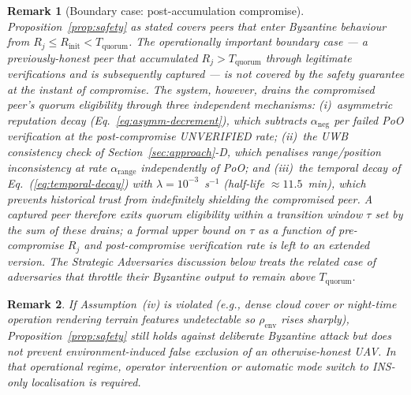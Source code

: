 \documentclass[journal,10pt,twocolumn]{IEEEtran}
\newtheorem{remark}{Remark}
\begin{document}
\begin{remark}[Boundary case: post-accumulation compromise]
\label{rem:post-accumulation}
Proposition~\ref{prop:safety} as stated covers peers that enter Byzantine behaviour from $R_j \leq R_\text{init} < T_\text{quorum}$. The operationally important boundary case --- a previously-honest peer that accumulated $R_j > T_\text{quorum}$ through legitimate verifications and is subsequently captured --- is not covered by the safety guarantee at the instant of compromise. The system, however, drains the compromised peer's quorum eligibility through three independent mechanisms: (i)~asymmetric reputation decay (Eq.~\ref{eq:asymm-decrement}), which subtracts $\alpha_\text{neg}$ per failed PoO verification at the post-compromise UNVERIFIED rate; (ii)~the UWB consistency check of Section~\ref{sec:approach}-D, which penalises range/position inconsistency at rate $\alpha_\text{range}$ independently of PoO; and (iii)~the temporal decay of Eq.~(\ref{eq:temporal-decay}) with $\lambda = 10^{-3}$~s$^{-1}$ (half-life $\approx 11.5$~min), which prevents historical trust from indefinitely shielding the compromised peer. A captured peer therefore exits quorum eligibility within a transition window $\tau$ set by the sum of these drains; a formal upper bound on $\tau$ as a function of pre-compromise $R_j$ and post-compromise verification rate is left to an extended version. The Strategic Adversaries discussion below treats the related case of adversaries that throttle their Byzantine output to remain above $T_\text{quorum}$.
\end{remark}

\begin{remark}
If Assumption~(iv) is violated (e.g., dense cloud cover or night-time operation rendering terrain features undetectable so $\rho_\text{env}$ rises sharply), Proposition~\ref{prop:safety} still holds against deliberate Byzantine attack but does not prevent environment-induced false exclusion of an otherwise-honest UAV. In that operational regime, operator intervention or automatic mode switch to INS-only localisation is required.
\end{remark}
\end{document}
